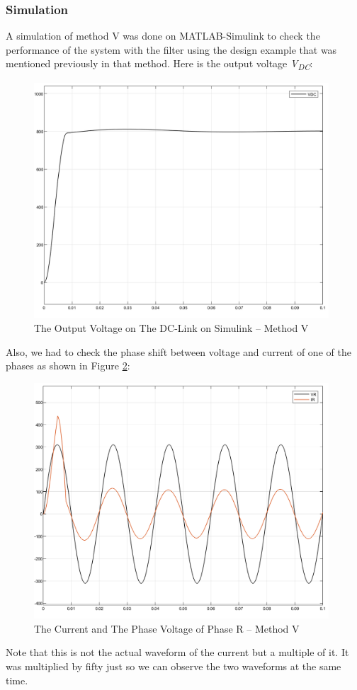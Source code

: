\documentclass[12pt,a4paper]{book}
\begin{document}
\subsubsection{Simulation}
A simulation of method V was done on MATLAB-Simulink to check the performance of the system with the filter using the design example that was mentioned previously in that method. Here is the output voltage \emph{V\textsubscript{DC}}:

\begin{figure}[h!]
  \centering
  \includegraphics[width=11cm]{image28.png}
  \caption{The Output Voltage on The DC-Link on Simulink -- Method V}
  \label{fig:image28}
\end{figure}
Also, we had to check the phase shift between voltage and current of one of the phases as shown in Figure \ref{fig:image29}:

\begin{figure}[h!]
  \centering
  \includegraphics[width=11cm]{image29.png}
  \caption{The Current and The Phase Voltage of Phase R -- Method V}
  \label{fig:image29}
\end{figure}
Note that this is not the actual waveform of the current but a multiple of it. It was multiplied by fifty just so we can observe the two waveforms at the same time.
\end{document}
